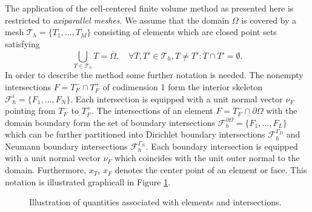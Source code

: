 \documentclass[a4paper,12pt]{article}
\begin{document}
The application of the cell-centered finite volume method as presented here is
restricted to \textit{axiparallel meshes}. We assume that  the domain $\Omega$ is covered by a mesh
$\mathcal{T}_h = \{T_1, \ldots, T_M\}$ consisting of elements
which are closed point sets satisfying
\begin{equation}
\bigcup_{T\in \mathcal{T}_h} T = \overline{\Omega}, \quad 
\forall T, T' \in \mathcal{T}_h, T\neq T' : \mathring{T} \cap \mathring{T}' = \emptyset .
\end{equation}
In order to describe the method some further notation is needed.
The nonempty intersections $F = T_F^-\cap T_F^+$ 
of codimension 1 form the interior skeleton $\mathcal{F}_h^i=\{F_1,\ldots,F_N\}$.
Each intersection is equipped with a unit normal vector $\nu_F$ pointing from $T_F^-$ to $T_F^+$.
The intersections of an element $F=T_F^-\cap\partial\Omega$ with the domain
boundary form the set of boundary intersections $\mathcal{F}_h^{\partial\Omega}=
\{F_1,\ldots,F_L\}$ which can be further partitioned into
Dirichlet boundary intersections $\mathcal{F}_h^{\Gamma_D}$
and Neumann boundary intersections $\mathcal{F}_h^{\Gamma_N}$.
Each boundary intersection is equipped with a unit normal vector
$\nu_F$ which coincides with the unit outer normal to the domain. 
Furthermore, $x_T$, $x_F$ denotes the center point of an element or face.
This notation is illustrated graphicall in Figure \ref{fig:MeshNotation}.

\begin{figure}
\begin{center}
\hspace{0.1\textwidth}
\end{center}
\caption{Illustration of quantities associated with elements and intersections.}
\label{fig:MeshNotation}
\end{figure}
\end{document}
